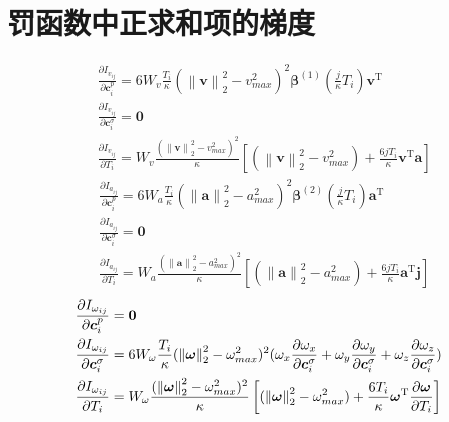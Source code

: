 
\chapter{罚函数中正求和项的梯度}\label{appdx:A}

\begin{align}
  & \frac{\partial I_{v_{ij}}}{\partial \bm{c}_i^{p}} = 
  6 W_v \frac{T_i}{\kappa} (\left\|\bm{v}\right\|_2^2 - v_{max}^2)^2 \bm{\beta}^{(1)}(\frac{j}{\kappa}T_i) \bm{v}^{\text{T}}
  \label{equ:Evdcp} \\
  & \frac{\partial I_{v_{ij}}}{\partial \bm{c}_i^{\sigma}} = \bm{0}
  \label{equ:Evdcs} \\ 
  & \frac{\partial I_{v_{ij}}}{\partial T_i} = 
  W_v \frac{(\left\|\bm{v}\right\|_2^2 - v_{max}^2)^2}{\kappa} \left[(\left\|\bm{v}\right\|_2^2 - v_{max}^2) + \frac{6jT_i}{\kappa}\bm{v}^{\text{T}}\bm{a}\right]
  \label{equ:EvdT}
\end{align}
\begin{align}
  & \frac{\partial I_{a_{ij}}}{\partial \bm{c}_i^{p}} = 
  6 W_a \frac{T_i}{\kappa} (\left\|\bm{a}\right\|_2^2 - a_{max}^2)^2 \bm{\beta}^{(2)}(\frac{j}{\kappa}T_i) \bm{a}^{\text{T}}
  \label{equ:Eadcp} \\
  & \frac{\partial I_{a_{ij}}}{\partial \bm{c}_i^{\sigma}} = \bm{0}
  \label{equ:Eadcs} \\ 
  & \frac{\partial I_{a_{ij}}}{\partial T_i} = 
  W_a \frac{(\left\|\bm{a}\right\|_2^2 - a_{max}^2)^2}{\kappa} \left[(\left\|\bm{a}\right\|_2^2 - a_{max}^2) + \frac{6jT_i}{\kappa}\bm{a}^{\text{T}}\bm{j}\right]
  \label{equ:EadT} 
\end{align}
\begin{align}
  & \frac{\partial{I_{\omega_{ij}}}}{\partial{\bm{c}_i^{p}}} = \textbf{0} 
  \label{equ:Eodcp} \\ 
  & \frac{\partial I_{\omega_{ij}}}{\partial \bm{c}_i^{\sigma}} = 
  6 W_{\omega} \frac{T_i}{\kappa} (\left\|\bm{\omega}\right\|_2^2 - \omega_{max}^2)^2 (\omega_x\frac{\partial{\omega_x}}{\partial{\bm{c}_i^{\sigma}}} + \omega_y\frac{\partial{\omega_y}}{\partial{\bm{c}_i^{\sigma}}} + \omega_z\frac{\partial{\omega_z}}{\partial{\bm{c}_i^{\sigma}}})
  \label{equ:Eodcs} \\ 
  & \frac{\partial I_{\omega_{ij}}}{\partial T_i} = 
  W_{\omega} \frac{(\left\|\bm{\omega}\right\|_2^2 - \omega_{max}^2)^2}{\kappa} \left[(\left\|\bm{\omega}\right\|_2^2 - \omega_{max}^2) + \frac{6T_i}{\kappa}\bm{\omega}^{\text{T}}\frac{\partial{\bm{\omega}}}{\partial{T_i}}\right]
\end{align}
